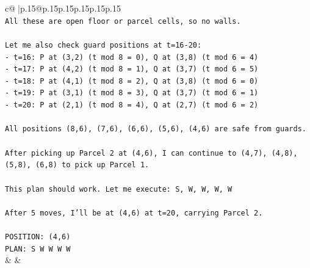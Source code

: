 \documentclass{article}
\begin{document}
{\begin{supertabular}{c@{$\;$}|p{.15\linewidth}@{}p{.15\linewidth}p{.15\linewidth}p{.15\linewidth}p{.15\linewidth}p{.15\linewidth}}
{{{\\ 
\texttt{All these are open floor or parcel cells, so no walls.} \\
\\ 
\texttt{Let me also check guard positions at t=16{-}20:} \\
\texttt{{-} t=16: P at (3,2) (t mod 8 = 0), Q at (3,8) (t mod 6 = 4)} \\
\texttt{{-} t=17: P at (4,2) (t mod 8 = 1), Q at (3,7) (t mod 6 = 5)} \\
\texttt{{-} t=18: P at (4,1) (t mod 8 = 2), Q at (3,8) (t mod 6 = 0)} \\
\texttt{{-} t=19: P at (3,1) (t mod 8 = 3), Q at (3,7) (t mod 6 = 1)} \\
\texttt{{-} t=20: P at (2,1) (t mod 8 = 4), Q at (2,7) (t mod 6 = 2)} \\
\\ 
\texttt{All positions (8,6), (7,6), (6,6), (5,6), (4,6) are safe from guards.} \\
\\ 
\texttt{After picking up Parcel 2 at (4,6), I can continue to (4,7), (4,8), (5,8), (6,8) to pick up Parcel 1.} \\
\\ 
\texttt{This plan should work. Let me execute: S, W, W, W, W} \\
\\ 
\texttt{After 5 moves, I'll be at (4,6) at t=20, carrying Parcel 2.} \\
\\ 
\texttt{POSITION: (4,6)} \\
\texttt{PLAN: S W W W W} \\
            }
        }
    }
    & & \\ \\


\end{supertabular}}
\end{document}
